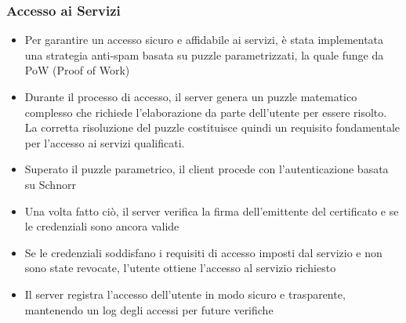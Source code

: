             \subsubsection{Accesso ai Servizi}
                \begin{itemize}
                    \item Per garantire un accesso sicuro e affidabile ai servizi, è stata implementata una strategia anti-spam basata su puzzle parametrizzati, la quale funge da PoW (Proof of Work)
                    
                    \item Durante il processo di accesso, il server genera un puzzle matematico complesso che richiede l'elaborazione da parte dell'utente per essere risolto. La corretta risoluzione del puzzle costituisce quindi un requisito fondamentale per l'accesso ai servizi qualificati.

                    \item Superato il puzzle parametrico, il client procede con l'autenticazione basata su Schnorr

                    \item Una volta fatto ciò, il server verifica la firma dell'emittente del certificato e se le credenziali sono ancora valide
                    
                    \item Se le credenziali soddisfano i requisiti di accesso imposti dal servizio e non sono state revocate, l'utente ottiene l'accesso al servizio richiesto
                    
                    \item Il server registra l'accesso dell'utente in modo sicuro e trasparente, mantenendo un log degli accessi per future verifiche
                \end{itemize}



